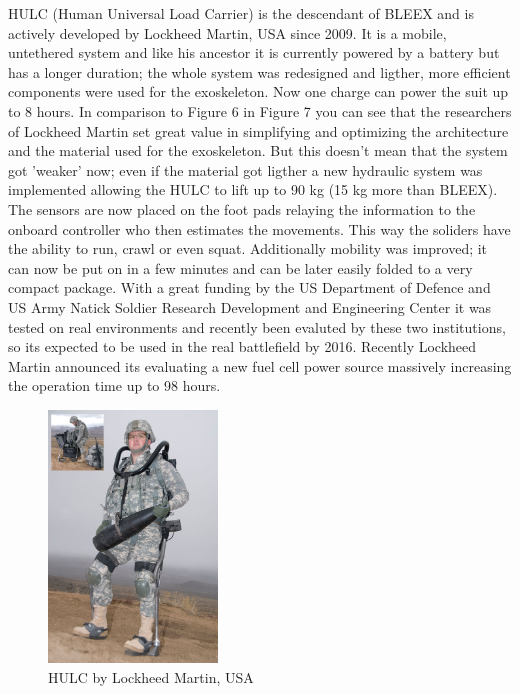 \documentclass[letterpaper, 10 pt, conference]{ieeeconf}  %
\begin{document}
HULC (Human Universal Load Carrier) is the descendant of BLEEX and is actively developed by Lockheed Martin,
USA since 2009. It is a mobile, untethered system and like his ancestor it is currently powered by a battery but
has a longer duration; the whole system was redesigned and ligther, more efficient components were used for the
exoskeleton. Now one charge can power the suit up to 8 hours. In comparison to Figure 6 in Figure 7 you can see
that the researchers of Lockheed Martin set great value in simplifying and optimizing the architecture and the material used for the exoskeleton. But this doesn't mean that the system got 'weaker' now; even if the material got ligther a new hydraulic system was implemented allowing the HULC to lift up to 90 kg (15 kg more than BLEEX). The sensors are now placed on the foot pads relaying the information to the onboard controller who then estimates the movements. This way the soliders have the ability to run, crawl or even squat. Additionally mobility was improved; it can now be put on in a few minutes and can be later easily folded to a very compact package. With a great funding by the US Department of Defence and US Army Natick Soldier Research Development and Engineering Center it was tested on real environments and recently been evaluted by these two institutions, so its expected to be used in the real battlefield by 2016. Recently Lockheed Martin announced its evaluating a new fuel cell power source massively increasing the operation time up to 98 hours.\newpage


\begin{figure}[H]
  \centering
    \includegraphics[width=0.4\textwidth]{img/hulc}
  \caption{HULC by Lockheed Martin, USA}
\end{figure}
\end{document}
